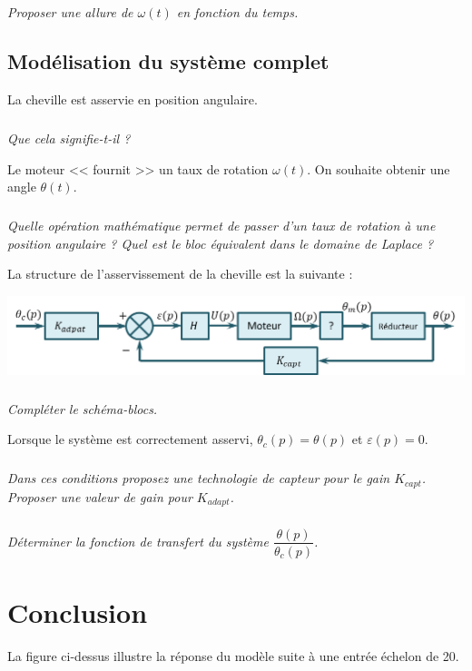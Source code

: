 \documentclass[10pt,fleqn]{article} %
\begin{document}
\begin{multicols}{2}
\subparagraph{}\textit{Proposer une allure de $\omega(t)$ en fonction du temps.}


\subsection*{Modélisation du système complet}
La cheville est asservie en position angulaire.
\subparagraph{}\textit{Que cela signifie-t-il ?}

\vspace{.25cm}

Le moteur << fournit >> un taux de rotation $\omega(t)$. On souhaite obtenir une angle $\theta(t)$.
\subparagraph{}\textit{Quelle opération mathématique permet de passer d'un taux de rotation à une position angulaire ? Quel est le bloc équivalent  dans le domaine de Laplace ?}

La structure de l'asservissement de la cheville est la suivante :

\begin{center}
\includegraphics[width=\linewidth]{images/fig_04}
\end{center}


\subparagraph{}\textit{Compléter le schéma-blocs.}

\vspace{.25cm}
Lorsque le système est correctement asservi, $\theta_c(p)=\theta(p)$ et $\varepsilon(p)=0$.

\subparagraph{}\textit{Dans ces conditions proposez une technologie de capteur pour le gain $K_{capt}$. Proposer une valeur de gain pour $K_{adapt}$.}

\subparagraph{}\textit{Déterminer la fonction de transfert du système $\dfrac{\theta(p)}{\theta_c(p)}$.}
\section*{Conclusion}

La figure ci-dessus illustre la réponse du modèle suite à une entrée échelon de 20\degres.


\end{multicols}
\end{document}

